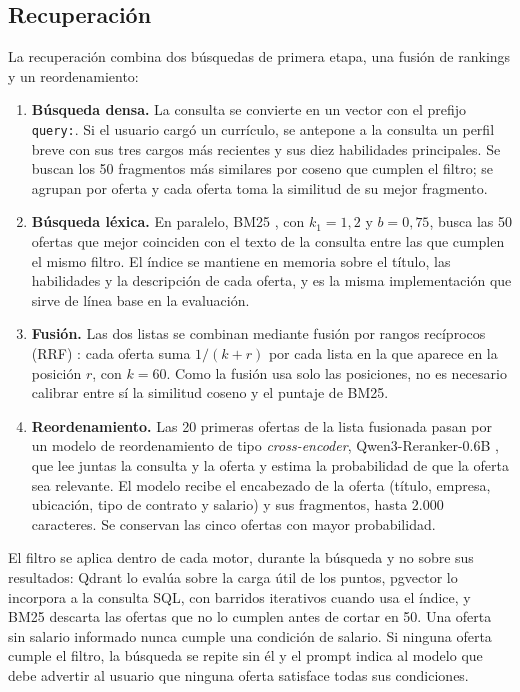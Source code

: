 \subsection{Recuperación}
\label{sec:art-recuperacion}

La recuperación combina dos búsquedas de primera etapa, una fusión de rankings y un reordenamiento:
\begin{enumerate}
    \item \textbf{Búsqueda densa.} La consulta se convierte en un vector con el prefijo \texttt{query:}. Si el usuario cargó un currículo, se antepone a la consulta un perfil breve con sus tres cargos más recientes y sus diez habilidades principales. Se buscan los 50 fragmentos más similares por coseno que cumplen el filtro; se agrupan por oferta y cada oferta toma la similitud de su mejor fragmento.
    \item \textbf{Búsqueda léxica.} En paralelo, BM25 \citep{Robertson2009}, con $k_1 = 1{,}2$ y $b = 0{,}75$, busca las 50 ofertas que mejor coinciden con el texto de la consulta entre las que cumplen el mismo filtro. El índice se mantiene en memoria sobre el título, las habilidades y la descripción de cada oferta, y es la misma implementación que sirve de línea base en la evaluación.
    \item \textbf{Fusión.} Las dos listas se combinan mediante fusión por rangos recíprocos (RRF) \citep{Cormack2009}: cada oferta suma $1/(k + r)$ por cada lista en la que aparece en la posición $r$, con $k = 60$. Como la fusión usa solo las posiciones, no es necesario calibrar entre sí la similitud coseno y el puntaje de BM25.
    \item \textbf{Reordenamiento.} Las 20 primeras ofertas de la lista fusionada pasan por un modelo de reordenamiento de tipo \textit{cross-encoder}, Qwen3-Reranker-0.6B \citep{Zhang2025Qwen3}, que lee juntas la consulta y la oferta \citep{Nogueira2019} y estima la probabilidad de que la oferta sea relevante. El modelo recibe el encabezado de la oferta (título, empresa, ubicación, tipo de contrato y salario) y sus fragmentos, hasta 2.000 caracteres. Se conservan las cinco ofertas con mayor probabilidad.
\end{enumerate}

El filtro se aplica dentro de cada motor, durante la búsqueda y no sobre sus resultados: Qdrant lo evalúa sobre la carga útil de los puntos, pgvector lo incorpora a la consulta SQL, con barridos iterativos cuando usa el índice, y BM25 descarta las ofertas que no lo cumplen antes de cortar en 50. Una oferta sin salario informado nunca cumple una condición de salario. Si ninguna oferta cumple el filtro, la búsqueda se repite sin él y el prompt indica al modelo que debe advertir al usuario que ninguna oferta satisface todas sus condiciones.

